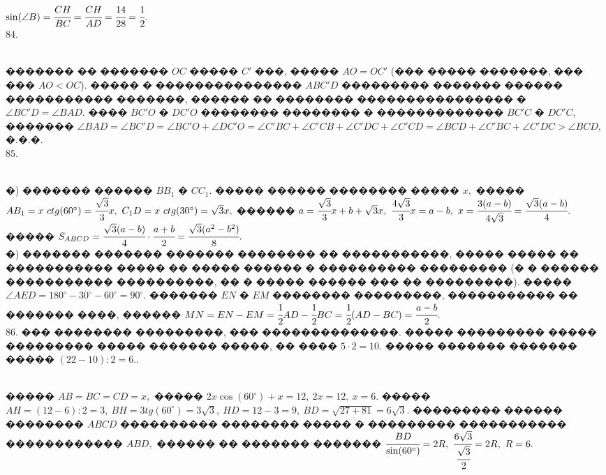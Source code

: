\documentclass[12pt]{article}
\begin{document}
$\sin(\angle B)=\cfrac{CH}{BC}=\cfrac{CH}{AD}=\cfrac{14}{28}=\cfrac{1}{2}.$\\
84. \begin{figure}[ht!]
\end{figure}\\
������� �� ������� $OC$ ����� $C'$ ���, ����� $AO=OC'$ (��� ����� �������, ��� ��� $AO<OC$). ����� � ��������������� $ABC'D$ ��������� ������� ������ ����������� �������, ������ �� �������� ���������������� � $\angle BC'D=\angle BAD.$ ���� $BC'O$ � $DC'O$ �������� �������� � ������������� $BC'C$ � $DC'C,$ ������� $\angle BAD=\angle BC'D=\angle BC'O+\angle DC'O=\angle C'BC+\angle C'CB+\angle C'DC+\angle C'CD=\angle BCD+\angle C'BC+\angle C'DC>\angle BCD,$ �.�.�.\\
85. \begin{figure}[ht!]
\end{figure}\\
�) ������� ������ $BB_1$ � $CC_1.$ ����� ������ �������� ����� $x,$ ����� $AB_1=x\ ctg(60^\circ)=\cfrac{\sqrt{3}}{3}x,\ C_1D=x\ ctg(30^\circ)=\sqrt{3}x,$ ������ $a=
\cfrac{\sqrt{3}}{3}x+b+\sqrt{3}x,\ \cfrac{4\sqrt{3}}{3}x=a-b,\ x=\cfrac{3(a-b)}{4\sqrt{3}}=\cfrac{\sqrt{3}(a-b)}{4}.$ �����
$S_{ABCD}=\cfrac{\sqrt{3}(a-b)}{4}\cdot\cfrac{a+b}{2}=\cfrac{\sqrt{3}(a^2-b^2)}{8}.$\\
�) ������� ������� ������� �������� �� �����������, ����� ����� �� ����������� ����� �� ����� ������ � ���������� ��������� (� � ������ ����������� ����������, �� � ����� ������ ��� �� ���������). ����� $\angle AED=180^\circ-30^\circ-60^\circ=90^\circ.$ ������� $EN$ � $EM$ �������� ���������, ����������� �� ������� ����, ������ $MN=EN-EM=\cfrac{1}{2}AD-\cfrac{1}{2}BC=\cfrac{1}{2}(AD-BC)=\cfrac{a-b}{2}.$\\
86. ��� �������� ���������, ��� ��������������. ����� ��������� ����� ��������� ����� ������� �����, �� ���� $5\cdot2=10.$ ����� ������� ������� ����� $(22-10):2=6.$\newpage{}. \begin{figure}[ht!]
\end{figure}\\
����� $AB=BC=CD=x,$ ����� $2x\cos(60^\circ)+x=12,\ 2x=12,\ x=6.$ ����� $AH=(12-6):2=3,\ BH=3tg(60^\circ)=3\sqrt{3},\ HD=12-3=9,\ BD=\sqrt{27+81}=6\sqrt{3}.$ ��������� ������ �������� $ABCD$ ���������� �������� ����� � ��������� ����������� ������������ $ABD,$ ������ �� ������� ������� $\cfrac{BD}{\sin(60^\circ)}=2R,\ \cfrac{6\sqrt{3}}{\cfrac{\sqrt{3}}{2}}=2R,\ R=6.$\\
\end{document}
